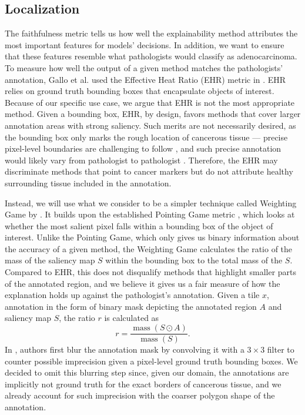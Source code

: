 \subsection*{Localization}

The faithfulness metric tells us how well the explainability method attributes the most important features for models' decisions.
In addition, we want to ensure that these features resemble what pathologists would classify as adenocarcinoma.
To measure how well the output of a given method matches the pathologists' annotation, Gallo et al. \cite{gallo} used the Effective Heat Ratio (EHR) \cite{ehr} metric in \cite{gallo}.
EHR relies on ground truth bounding boxes that encapsulate objects of interest.
Because of our specific use case, we argue that EHR is not the most appropriate method.
Given a bounding box, EHR, by design, favors methods that cover larger annotation areas with strong saliency.
Such merits are not necessarily desired, as the bounding box only marks the rough location of cancerous tissue --- precise pixel-level boundaries are challenging to follow \cite{gallo, annotation-agreement}, and such precise annotation would likely vary from pathologist to pathologist \cite{annotation-agreement}.
Therefore, the EHR may discriminate methods that point to cancer markers but do not attribute healthy surrounding tissue included in the annotation.

Instead, we will use what we consider to be a simpler technique called Weighting Game by \cite{weighting-game}.
It builds upon the established Pointing Game metric \cite{pointing-game}, which looks at whether the most salient pixel falls within a bounding box of the object of interest.
Unlike the Pointing Game, which only gives us binary information about the accuracy of a given method, the Weighting Game calculates the ratio of the mass of the saliency map $S$ within the bounding box to the total mass of the $S$.
Compared to EHR, this does not disqualify methods that highlight smaller parts of the annotated region, and we believe it gives us a fair measure of how the explanation holds up against the pathologist's annotation.
Given a tile $x$, annotation in the form of binary mask depicting the annotated region $A$ and saliency map $S$, the ratio $r$ is calculated as
\begin{equation}\label{eq:wg}
    r = \frac{\operatorname{\text{mass}}(S \odot A)}{\operatorname{\text{mass}}(S)}.
\end{equation}
In \cite{weighting-game}, authors first blur the annotation mask by convolving it with a $3 \times 3$ filter to counter possible imprecision given a pixel-level ground truth bounding boxes.
We decided to omit this blurring step since, given our domain, the annotations are implicitly not ground truth for the exact borders of cancerous tissue, and we already account for such imprecision with the coarser polygon shape of the annotation.

